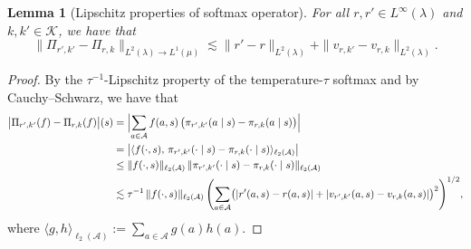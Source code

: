 \documentclass[11pt]{article}
\theoremstyle{plain}
\newtheorem{lemma}[theorem]{Lemma}
\begin{document}
 



\begin{lemma}[Lipschitz properties of softmax operator]
\label{lemma::softmaxLipschitz}
 For all $r, r' \in L^\infty(\lambda)$ and $k, k' \in \mathcal{K}$, we have that
$$\bigl\|\Pi_{r',k'}-\Pi_{r,k}\bigr\|_{L^2(\lambda) \rightarrow L^1(\mu)} \lesssim \|r'-r\|_{L^2(\lambda)}
       + \|v_{r,k'}-v_{r,k}\|_{L^2(\lambda)}.$$
\end{lemma}
\begin{proof}
By the $\tau^{-1}$-Lipschitz property of the temperature-$\tau$ softmax and by Cauchy--Schwarz, we have that
\begin{align*}
   \bigl|\Pi_{r',k'}(f)-\Pi_{r,k}(f)\bigr|(s)
   &= \Bigl|\sum_{a \in \mathcal{A}} f(a,s)\,\bigl(\pi_{r',k'}(a\mid s)-\pi_{r,k}(a\mid s)\bigr)\Bigr| \\
   &= \bigl|\langle f(\cdot,s),\,\pi_{r',k'}(\cdot\mid s)-\pi_{r,k}(\cdot\mid s)\rangle_{\ell_2(\mathcal A)}\bigr| \\
   &\le \|f(\cdot,s)\|_{\ell_2(\mathcal A)} \,\|\pi_{r',k'}(\cdot\mid s)-\pi_{r,k}(\cdot\mid s)\|_{\ell_2(\mathcal A)} \\
   &\lesssim \tau^{-1}\,\|f(\cdot,s)\|_{\ell_2(\mathcal A)} \,
   \Biggl(\sum_{a\in\mathcal A}
      \bigl(|r'(a,s)-r(a,s)| + |v_{r',k'}(a,s)-v_{r,k}(a,s)|\bigr)^2
   \Biggr)^{1/2},
\end{align*}
where $ \langle g,h\rangle_{\ell_2(\mathcal A)} := \sum_{a\in\mathcal A} g(a)h(a)$. 



\end{proof}
\end{document}
